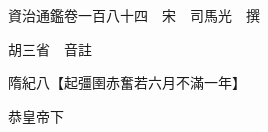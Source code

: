 










 


 
 


 

  
  
  
  
  





  
  
  
  
  
 
  

  

  
  
  



  

 
 

  
   




  

  
  


  　　資治通鑑卷一百八十四　宋　司馬光　撰

　　胡三省　音註

　　隋紀八【起彊圉赤奮若六月不滿一年】

　　恭皇帝下

